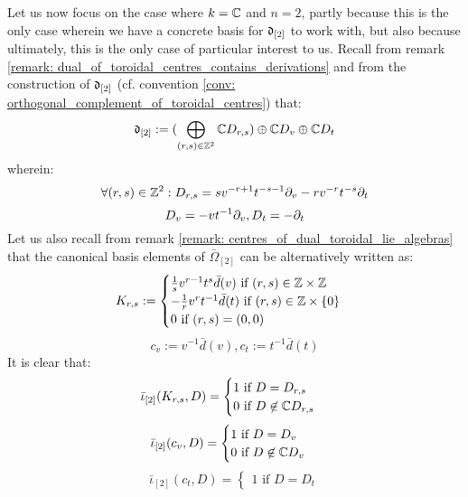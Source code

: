 \begin{remark}
            Let us now focus on the case where $k = \bbC$ and $n = 2$, partly because this is the only case wherein we have a concrete basis for $\d_{[2]}$ to work with, but also because ultimately, this is the only case of particular interest to us. Recall from remark \ref{remark: dual_of_toroidal_centres_contains_derivations} and from the construction of $\d_{[2]}$ (cf. convention \ref{conv: orthogonal_complement_of_toroidal_centres}) that:
                $$\d_{[2]} := (\bigoplus_{(r, s) \in \Z^2} \bbC D_{r, s}) \oplus \bbC D_v \oplus \bbC D_t$$
            wherein:
                $$\forall (r, s) \in \Z^2: D_{r, s} = s v^{-r + 1} t^{-s - 1} \del_v - r v^{-r} t^{-s} \del_t$$
                $$D_v = -v t^{-1} \del_v, D_t = -\del_t$$
            Let us also recall from remark \ref{remark: centres_of_dual_toroidal_lie_algebras} that the canonical basis elements of $\bar{\Omega}_{[2]}$ can be alternatively written as:
                $$
                    K_{r, s} :=
                    \begin{cases}
                        \text{$\frac1s v^{r - 1} t^s \bar{d}(v)$ if $(r, s) \in \Z \x \Z$}
                        \\
                        \text{$-\frac1r v^r t^{-1} \bar{d}(t)$ if $(r, s) \in \Z \x \{0\}$}
                        \\
                        \text{$0$ if $(r, s) = (0, 0)$}
                    \end{cases}
                $$
                $$c_v := v^{-1} \bar{d}(v), c_t := t^{-1} \bar{d}(t)$$
            It is clear that:
                $$
                    \bar{\iota}_{[2]}( K_{r, s}, D ) =
                    \begin{cases}
                        \text{$1$ if $D = D_{r, s}$}
                        \\
                        \text{$0$ if $D \not \in \bbC D_{r, s}$}
                    \end{cases}
                $$
                $$
                    \bar{\iota}_{[2]}( c_v, D ) =
                    \begin{cases}
                        \text{$1$ if $D = D_v$}
                        \\
                        \text{$0$ if $D \not \in \bbC D_v$}
                    \end{cases}
                $$
                $$
                    \bar{\iota}_{[2]}( c_t, D ) =
                    \begin{cases}
                        \text{$1$ if $D = D_t$}

\end{cases}$$
\end{remark}
